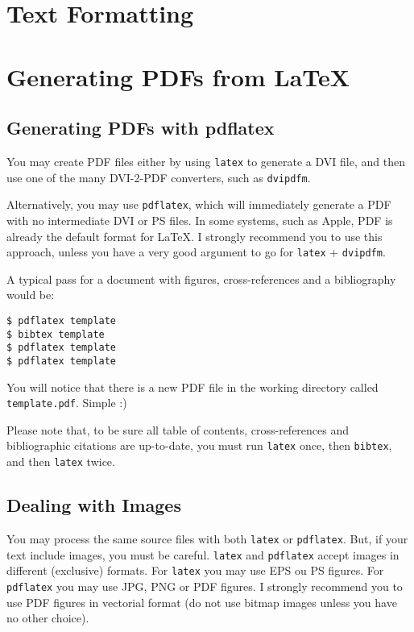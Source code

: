 \lipsum[1-3]


\section{Text Formatting} %
\label{sec:text_formatting}



\section{Generating PDFs from \LaTeX} %
\label{sec:generating_pdfs_from_latex}

\subsection{Generating PDFs with pdflatex} %
\label{ssec:generating_pdfs_with_pdflatex}

You may create PDF files either by using \verb!latex! to generate a DVI file, and then use one of the many DVI-2-PDF converters, such as \verb!dvipdfm!.

Alternatively, you may use \verb!pdflatex!, which will immediately generate a PDF with no intermediate DVI or PS files. In some systems, such as Apple, PDF is already the default format for \LaTeX. I strongly recommend you to use this approach, unless you have a very good argument to go for \verb!latex! + \verb!dvipdfm!.

A typical pass for a document with figures, cross-references and a bibliography would be:
\begin{verbatim}
$ pdflatex template
$ bibtex template
$ pdflatex template
$ pdflatex template
\end{verbatim}
You will notice that there is a new PDF file in the working directory called \verb!template.pdf!. Simple :)

Please note that, to be sure all table of contents, cross-references and bibliographic citations are up-to-date, you must run \verb!latex! once, then \verb!bibtex!, and then \verb!latex! twice.

\subsection{Dealing with Images} %
\label{sub:dealing_with_images}

You may process the same source files with both \verb!latex! or \verb!pdflatex!. But, if your text include images, you must be careful. \verb!latex! and \verb!pdflatex! accept images in different (exclusive) formats.  For \verb!latex! you may use EPS ou PS figures. For \verb!pdflatex! you may use JPG, PNG or PDF figures.  I strongly recommend you to use PDF figures in vectorial format (do not use bitmap images unless you have no other choice).


